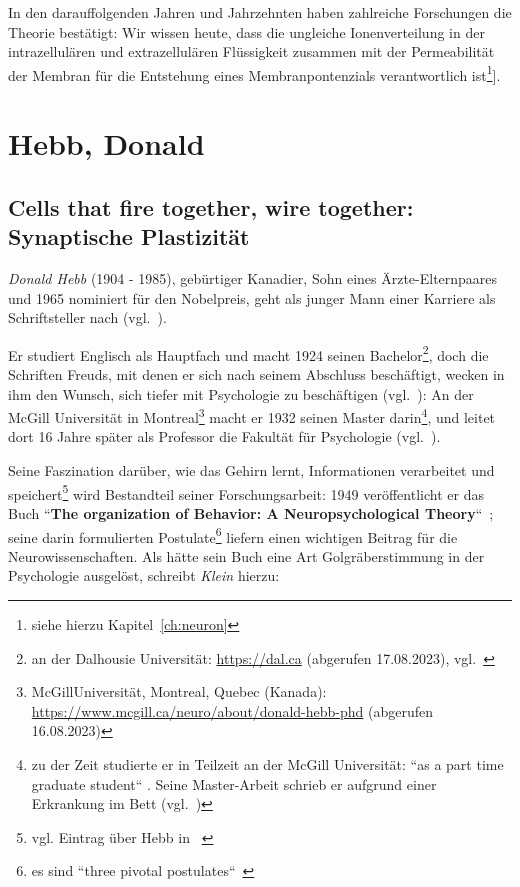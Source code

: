 In den darauffolgenden Jahren und Jahrzehnten haben zahlreiche Forschungen die Theorie bestätigt: Wir wissen heute, dass die ungleiche Ionenverteilung in der intrazellulären und extrazellulären Flüssigkeit zusammen mit der Permeabilität der Membran für die Entstehung eines Membranpontenzials verantwortlich ist\footnote{siehe hierzu Kapitel~\ref{ch:neuron}}].

\section{Hebb, Donald}\label{appendix:hebb}
\subsection*{Cells that fire together, wire together: Synaptische Plastizität}

\textit{Donald Hebb} (1904 - 1985), gebürtiger Kanadier, Sohn eines Ärzte-Elternpaares und 1965 nominiert für den Nobelpreis, geht als junger Mann einer Karriere als Schriftsteller nach (vgl.~\cite[1013 f.]{BM03}).

Er studiert Englisch als Hauptfach und macht 1924 seinen Bachelor\footnote{
    an der Dalhousie Universität: \url{https://dal.ca} (abgerufen 17.08.2023), vgl.~\cite[852]{Coo05}
}, doch die Schriften Freuds, mit denen er sich nach seinem Abschluss beschäftigt, wecken in ihm den Wunsch, sich tiefer mit Psychologie zu beschäftigen (vgl.~\cite[1013]{BM03}): An der McGill Universität in Montreal\footnote{
    McGillUniversität, Montreal, Quebec (Kanada): \url{https://www.mcgill.ca/neuro/about/donald-hebb-phd} (abgerufen 16.08.2023)
} macht er 1932 seinen Master darin\footnote{
    zu der Zeit studierte er in Teilzeit an der McGill Universität: ``as a part time graduate student`` \cite[1]{Kle99}. Seine Master-Arbeit schrieb er aufgrund einer Erkrankung im Bett (vgl.~\cite[1014]{BM03})
}, und leitet dort 16 Jahre später als Professor die Fakultät für Psychologie (vgl.~\cite[853]{Coo05}).

Seine Faszination darüber, wie das Gehirn lernt, Informationen verarbeitet und speichert\footnote{vgl. Eintrag über Hebb in ~\cite[298 f.]{Str01}} wird Bestandteil seiner Forschungsarbeit: 1949 veröffentlicht er das Buch ``\textbf{The organization of Behavior: A Neuropsychological Theory}``~\cite{Heb49}; seine darin formulierten Postulate\footnote{
    es sind ``three pivotal postulates``~\cite[2]{Kle99}
} liefern einen wichtigen Beitrag für die Neurowissenschaften. Als hätte sein Buch eine Art Golgräberstimmung in der Psychologie ausgelöst, schreibt \textit{Klein} hierzu:

